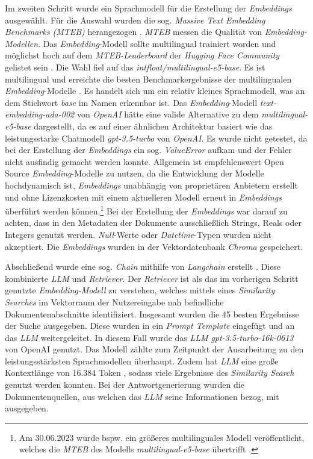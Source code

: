 Im zweiten Schritt wurde ein Sprachmodell für die Erstellung der \textit{Embeddings} ausgewählt. Für die Auswahl wurden die sog. \textit{Massive Text Embedding Benchmarks (MTEB)} herangezogen \parencite{muennighoff2023}. \textit{MTEB} messen die Qualität von \textit{Embedding-Modellen}. Das \textit{Embedding}-Modell sollte multilingual trainiert worden und möglichst hoch auf dem \textit{MTEB-Leaderboard} der \textit{Hugging Face Community} gelistet sein \parencite{huggingfacea}. Die Wahl fiel auf das \textit{intfloat/multilingual-e5-base}. Es ist multilingual und erreichte die besten Benchmarkergebnisse der multilingualen \textit{Embedding}-Modelle \parencite{intfloat,wang2022}. Es handelt sich um ein relativ kleines Sprachmodell, was an dem Stichwort \textit{base} im Namen erkennbar ist. Das \textit{Embedding}-Modell \textit{text-embedding-ada-002} von \textit{OpenAI} hätte eine valide Alternative zu dem \textit{multilingual-e5-base} dargestellt, da es auf einer ähnlichen Architektur basiert wie das leistungsstarke Chatmodell \textit{gpt-3.5-turbo} von \textit{OpenAI}. Es wurde nicht getestet, da bei der Erstellung der \textit{Embeddings} ein sog. \textit{ValueError} aufkam und der Fehler nicht ausfindig gemacht werden konnte. Allgemein ist empfehlenswert Open Source \textit{Embedding}-Modelle zu nutzen, da die Entwicklung der Modelle hochdynamisch ist, \textit{Embeddings} unabhängig von proprietären Anbietern erstellt und ohne Lizenzkosten mit einem aktuelleren Modell erneut in \textit{Embeddings} überführt werden können.\footnote{Am 30.06.2023 wurde bspw. ein größeres multilinguales Modell veröffentlicht, welches die \textit{MTEB} des Modells \textit{multilingual-e5-base} übertrifft \parencite{intfloata}.} Bei der Erstellung der \textit{Embeddings} war darauf zu achten, dass in den Metadaten der Dokumente ausschließlich Strings, Reals oder Integers genutzt werden. \textit{Null}-Werte oder \textit{Datetime}-Typen wurden nicht akzeptiert. Die \textit{Embeddings} wurden in der Vektordatenbank \textit{Chroma} gespeichert.

Abschließend wurde eine sog. \textit{Chain} mithilfe von \textit{Langchain} erstellt \parencite{langchaina}. Diese kombinierte \textit{LLM} und \textit{Retriever}. Der \textit{Retriever} ist als das im vorherigen Schritt genutzte \textit{Embedding-Modell} zu verstehen, welches mittels eines \textit{Similarity Searches} im Vektorraum der Nutzereingabe nah befindliche Dokumentenabschnitte identifiziert. Insgesamt wurden die 45 besten Ergebnisse der Suche ausgegeben. Diese wurden in ein \textit{Prompt Template} eingefügt und an das \textit{LLM} weitergeleitet. In diesem Fall wurde das \textit{LLM} \textit{gpt-3.5-turbo-16k-0613} von OpenAI genutzt. Das Modell zählte zum Zeitpunkt der Ausarbeitung zu den leistungsstärksten Sprachmodellen überhaupt. Zudem hat \textit{LLM} eine große Kontextlänge von 16.384 Token \parencite{openai}, sodass viele Ergebnisse des \textit{Similarity Search} genutzt werden konnten. Bei der Antwortgenerierung wurden die Dokumentenquellen, aus welchen das \textit{LLM} seine Informationen bezog, mit ausgegeben.


